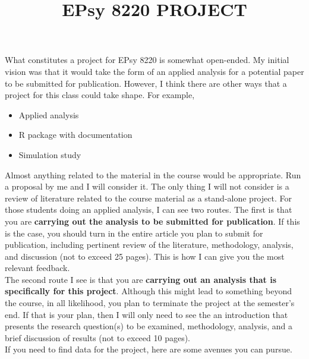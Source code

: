 \documentclass[]{article}
\title{EPsy 8220 PROJECT}
\author{}
\date{}
\begin{document}
\renewcommand{\labelenumi}{\alph{enumi}.} 

\maketitle 
\thispagestyle{fancy}

\noindent What constitutes a project for EPsy 8220 is somewhat open-ended. My initial vision was that it would take the form of an applied analysis for a potential paper to be submitted for publication. However, I think there are other ways that a project for this class could take shape. For example,

\begin{itemize}
\item Applied analysis
\item R package with documentation
\item Simulation study
\end{itemize}

\noindent Almost anything related to the material in the course would be appropriate. Run a proposal by me and I will consider it. The only thing I will not consider is a review of literature related to the course material as a stand-alone project. For those students doing an applied analysis, I can see two routes. The first is that you are \textbf{carrying out the analysis to be submitted for publication}. If this is the case, you should turn in the entire article you plan to submit for publication, including pertinent review of the literature, methodology, analysis, and discussion (not to exceed 25 pages). This is how I can give you the most relevant feedback. \\
\linebreak
The second route I see is that you are \textbf{carrying out an analysis that is specifically for this project}. Although this might lead to something beyond the course, in all likelihood, you plan to terminate the project at the semester's end. If that is your plan, then I will only need to see the an introduction that presents the research question(s) to be examined, methodology, analysis, and a brief discussion of results (not to exceed 10 pages).\\
\linebreak
If you need to find data for the project, here are some avenues you can pursue.
\end{document}
